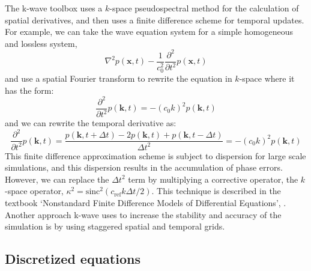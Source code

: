 \documentclass[10pt,a4paper]{article}
\begin{document}
The k-wave toolbox uses a $k$-space pseudospectral method for the calculation of spatial derivatives, and then uses a finite difference scheme for temporal updates. For example, we can take the wave equation system for a simple homogeneous and lossless system,
\begin{equation}
\nabla^2 p (\textbf{x},t) - \dfrac{1}{c_0^2} \dfrac{\partial^2}{\partial t^2} p (\textbf{x},t)
\end{equation}
and use a spatial Fourier transform to rewrite the equation in $k$-space where it has the form:
\begin{equation}
\frac{\partial^2}{\partial t^2} p(\textbf{k},t) = - (c_0 k)^2 p(\textbf{k},t)
\end{equation}
and we can rewrite the temporal derivative as:
\begin{equation}
\frac{\partial^2}{\partial t^2} p(\textbf{k},t) = \dfrac{p(\textbf{k},t+\Delta t) - 2p(\textbf{k},t)+p(\textbf{k}, t-\Delta t)}{\Delta t^2} = - (c_0 k)^2 p(\textbf{k},t)
\end{equation}
This finite difference approximation scheme is subject to dispersion for large scale simulations, and this dispersion results in the accumulation of phase errors. However, we can replace the $\Delta t^2$ term by multiplying a corrective operator, the $k$-space operator, $\kappa^2 = \text{sinc}^2(c_{\text{ref}} k \Delta t/2)$. This technique is described in the textbook `Nonstandard Finite Difference Models of Differential Equations', \cite{mickens1993nonstandard}. Another approach k-wave uses to increase the stability and accuracy of the simulation is by using staggered spatial and temporal grids. 

\subsection*{Discretized equations}
\end{document}
